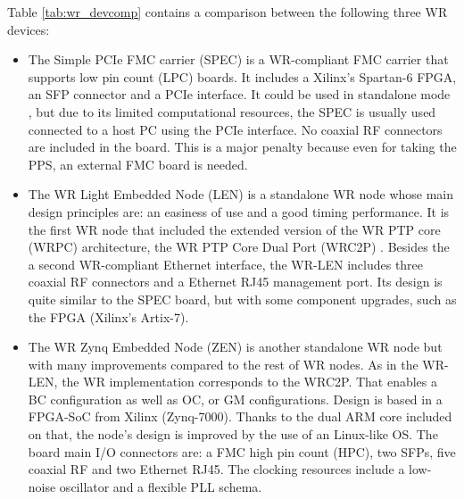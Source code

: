 Table \ref{tab:wr_devcomp} contains a comparison between the following three WR 
devices: 
\begin{itemize}
	\item The Simple PCIe FMC carrier (SPEC) \cite{ohwr:spec} is a WR-compliant 
	FMC carrier that supports low pin count (LPC) boards. It includes a 
	Xilinx's Spartan-6 FPGA, an SFP connector and a PCIe interface. It could be 
	used in standalone mode \cite{migueljl-paper-wr-spec}, but due to its 
	limited computational resources, the SPEC is usually used connected to a 
	host PC using the PCIe interface. 
	No coaxial RF connectors are included in the board. This is a major penalty 
	because even for taking the PPS, an external FMC board is needed.
	
	\item The WR Light Embedded Node (LEN) \cite{sevensols:wr_len} is a 
	standalone WR node whose main design principles are: an easiness of use and 
	a good timing performance. It is the first WR node that included the 
	extended version of the WR PTP core (WRPC) architecture, the WR PTP Core 
	Dual Port (WRC2P) \cite{torres2016scalability}. Besides the a second 
	WR-compliant 
	Ethernet interface, the WR-LEN includes three coaxial RF connectors and a 
	Ethernet RJ45 management port. Its design is quite similar to the SPEC 
	board, but with some component upgrades, such as the FPGA (Xilinx's 
	Artix-7).
	
	\item The WR Zynq Embedded Node (ZEN) \cite{sevensols:wr_zen} is another 
	standalone WR node but with many improvements compared to the rest of WR 
	nodes. As in the WR-LEN, the WR implementation corresponds to the WRC2P. 
	That enables a BC configuration as well as OC, or GM configurations. Design 
	is based in a FPGA-SoC from Xilinx (Zynq-7000). Thanks to the dual ARM core 
	included on that, the node's design is improved by the use of an Linux-like 
	OS. The board main I/O connectors are: a FMC high pin count (HPC), two 
	SFPs, five coaxial RF and two Ethernet RJ45. The clocking resources include 
	a low-noise oscillator and a flexible PLL schema.
\end{itemize}

